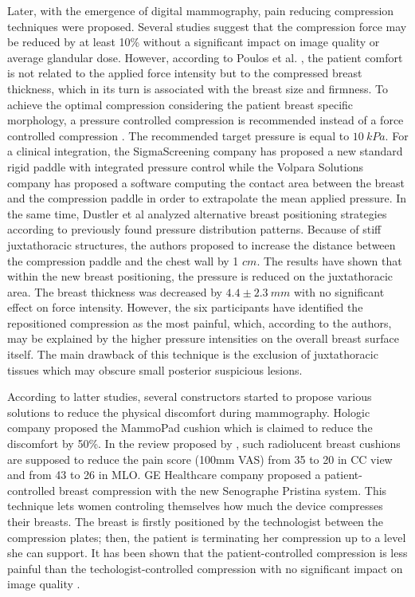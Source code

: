 Later, with the emergence of digital mammography, pain reducing compression techniques were proposed. Several studies \citep{chida_reduced_2009,saunders_effect_2008} suggest that the compression force may be reduced by at least 10\% without a significant impact on image quality or average glandular dose. However, according to Poulos et al. \cite{poulos_breast_2003}, the patient comfort is not related to the applied force intensity but to the compressed breast thickness, which in its turn is associated with the breast size and firmness. To achieve the optimal compression considering the patient breast specific morphology, a pressure controlled compression is recommended instead of a force controlled compression \citep{de_pain_2015}. The recommended target pressure is equal to $10\ kPa$. For a clinical integration, the SigmaScreening company has proposed a new standard rigid paddle with integrated pressure control while the Volpara Solutions company has proposed a software computing the contact area between the breast and the compression paddle in order to extrapolate the mean applied pressure.  In the same time, Dustler et al \cite{dustler_effect_2012} analyzed alternative breast positioning strategies according to previously found pressure distribution patterns. Because of stiff juxtathoracic structures, the authors proposed to increase the distance between the compression paddle and the chest wall by 1 $cm$. The results have shown that within the new breast positioning, the pressure is reduced on the juxtathoracic area. The breast thickness was decreased by $4.4\pm2.3 \ mm$ with no significant effect on force intensity. However, the six participants have identified the repositioned compression as the most painful, which, according to the authors, may be explained by the higher pressure intensities on the overall breast surface itself.  The main drawback of this technique is the exclusion of juxtathoracic tissues which may obscure small posterior suspicious lesions. 
 
According to latter studies, several constructors started to propose various solutions to reduce the physical discomfort during mammography. Hologic company proposed the MammoPad cushion which is claimed to reduce the discomfort by 50\%. In the review proposed by \cite{miller_interventions_2008}, such radiolucent breast cushions are supposed to reduce the pain score (100mm VAS) from 35 to 20 in CC view and from 43 to 26 in MLO. GE Healthcare company proposed a patient-controlled breast compression with the new Senographe Pristina system. This technique lets women controling themselves how much the device compresses their breasts.  The breast is firstly positioned by the technologist between the compression plates; then, the patient is terminating her compression up to a level she can support. It has been shown that the patient-controlled compression is less painful than the techologist-controlled compression with no significant impact on image quality  \citep{miller_interventions_2008}.

